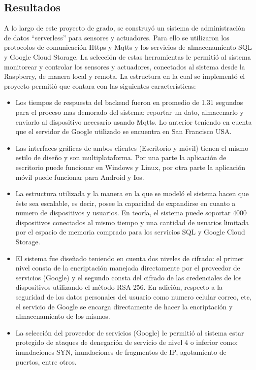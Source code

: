 \subsection{Resultados}
A lo largo de este proyecto de grado, se construyó un sistema de administración de datos ``serverless'' para sensores y actuadores. Para ello se utilizaron los protocolos de comunicación Https y Mqtts y los servicios de almacenamiento SQL y Google Cloud Storage. La selección de estas herramientas le permitió al sistema monitorear y controlar los sensores y actuadores, conectados al sistema desde la Raspberry, de manera local y remota. La estructura en la cual se implementó el proyecto permitió que contara con las siguientes características:
\begin{itemize}
	\item Los tiempos de respuesta del backend fueron en promedio de 1.31 segundos para el proceso mas demorado del sistema: reportar un dato, almacenarlo y enviarlo al dispositivo necesario usando Mqtts. Lo anterior teniendo en cuenta que el servidor de Google utilizado se encuentra en San Francisco USA.
	\item Las interfaces gráficas de ambos clientes (Escritorio y móvil) tienen el mismo estilo de diseño y son multiplataforma. Por una parte la aplicación de escritorio puede funcionar en Windows y Linux, por otra parte la aplicación móvil puede funcionar para Android y Ios.
	\item La estructura utilizada y la manera en la que se modeló el sistema hacen que éste sea escalable, es decir, posee la capacidad de expandirse en cuanto a numero de dispositivos y usuarios. En teoría, el sistema puede soportar 4000 dispositivos conectados al mismo tiempo y una cantidad de usuarios limitada por el espacio de memoria comprado para los servicios SQL y Google Cloud Storage.
	\item El sistema fue diseñado teniendo en cuenta dos niveles de cifrado: el primer nivel consta de la encriptación manejada directamente por el proveedor de servicios (Google) y el segundo consta del cifrado de las credenciales de los dispositivos utilizando el método RSA-256. En adición, respecto a la seguridad de los datos personales del usuario como numero celular correo, etc, el servicio de Google se encarga directamente de hacer la encriptación y almacenamiento de los mismos.
	\item La selección del proveedor de servicios (Google) le permitió al sistema estar protegido de ataques de denegación de servicio de nivel 4 o inferior como: inundaciones SYN, inundaciones de fragmentos de IP, agotamiento de puertos, entre otros.
	
\end{itemize}
